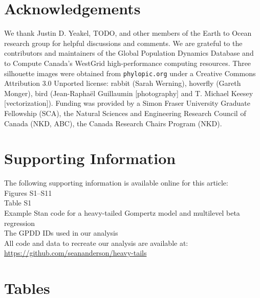 
\section{Acknowledgements}

We thank Justin D. Yeakel, TODO, and other members of the Earth to Ocean research group for helpful discussions and comments. We are grateful to the contributors and maintainers of the Global Population Dynamics Database and to Compute Canada's WestGrid high-performance computing resources. Three silhouette images were obtained from \texttt{phylopic.org} under a Creative Commons Attribution 3.0 Unported license: rabbit (Sarah Werning), hoverfly (Gareth Monger), bird (Jean-Raphaël Guillaumin {[}photography{]} and T. Michael Keesey {[}vectorization{]}). Funding was provided by a Simon Fraser University Graduate Fellowship (SCA), the Natural Sciences and Engineering Research Council of Canada (NKD, ABC), the Canada Research Chairs Program (NKD).

\section{Supporting Information}

The following supporting information is available online for this article:\\
Figures S1--S11\\
Table S1\\
Example Stan code for a heavy-tailed Gompertz model and multilevel beta
regression\\
The GPDD IDs used in our analysis\\
All code and data to recreate our analysis are available at:\\
\url{https://github.com/seananderson/heavy-tails}




\clearpage

\section{Tables}



